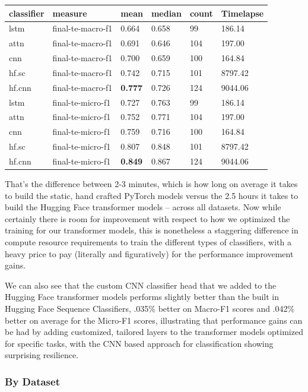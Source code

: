 \documentclass[final]{clv2025}
\begin{document}
\begin{table}[h!]
\label{tab}
\begin{tabular}{llllll}
\toprule
\textbf{classifier} &	\textbf{measure} &	\textbf{mean} &	\textbf{median} &	\textbf{count} &	\textbf{Timelapse}\\
\midrule
lstm&	final-te-macro-f1&	0.664&	0.658&	99&	186.14\\
attn&	final-te-macro-f1&	0.691&	0.646&	104&	197.00\\
cnn&	final-te-macro-f1&	0.700&	0.659&	100&	164.84\\
hf.sc&	final-te-macro-f1&	0.742&	0.715&	101	&8797.42\\
hf.cnn&	final-te-macro-f1&	\textbf{0.777}&	0.726&	124	&9044.06\\
lstm	&final-te-micro-f1&	0.727&	0.763&	99	&186.14\\
attn&	final-te-micro-f1&	0.752&	0.771&	104	&197.00\\
cnn	&final-te-micro-f1&	0.759	&0.716	&100	&164.84\\
hf.sc&	final-te-micro-f1&	0.807&	0.848&	101	&8797.42\\
hf.cnn&	final-te-micro-f1&	\textbf{0.849}&	0.867&	124	&9044.06\\


\bottomrule
\end{tabular}
\end{table}
That’s the difference between 2-3 minutes, which is how long on average it takes to build the static, hand crafted PyTorch models versus the 2.5 hours it takes to build the Hugging Face transformer models – across all datasets. Now while certainly there is room for improvement with respect to how we optimized the training for our transformer models, this is nonetheless a staggering difference in compute resource requirements to train the different types of classifiers, with a heavy price to pay (literally and figuratively) for the performance improvement gains.

We can also see that the custom CNN classifier head that we added to the Hugging Face transformer models performs slightly better than the built in Hugging Face Sequence Classifiers, .035\% better on Macro-F1 scores and .042\% better on average for the Micro-F1 scores, illustrating that performance gains can be had by adding customized, tailored layers to the transformer models optimized for specific tasks, with the CNN based approach for classification showing surprising resilience.

\subsubsection{By Dataset}
\end{document}
